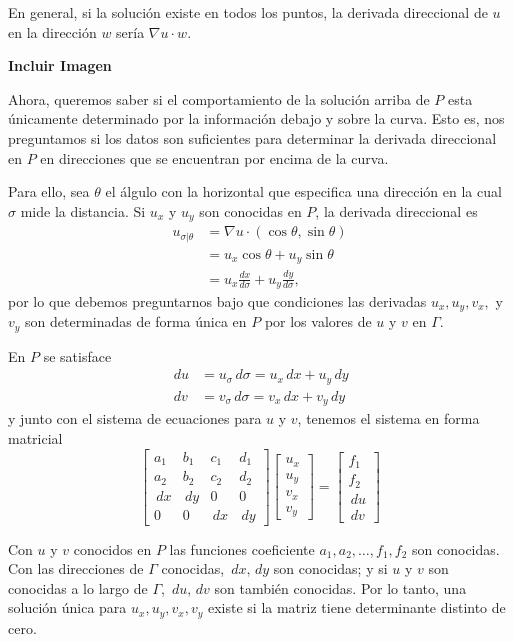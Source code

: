 En general, si la solución existe en todos los puntos, la derivada direccional de $u$ en la dirección $w$ sería $\nabla u \cdot w$.

\textbf{Incluir Imagen}

Ahora, queremos saber si el comportamiento de la solución arriba de $P$ esta únicamente determinado por la información debajo y sobre la curva. Esto es, nos preguntamos si los datos son suficientes para determinar la derivada direccional en $P$ en direcciones que se encuentran por encima de la curva.

Para ello, sea $\theta$ el álgulo con la horizontal que especifica una dirección en la cual $\sigma$ mide la distancia. Si $u_x$ y $u_y$ son conocidas en $P$, la derivada direccional es
\begin{align*}
u_{\sigma|\theta} &= \nabla u \cdot (\cos \theta, \sin \theta) \\
&= u_x \cos \theta + u_y \sin \theta \\
&= u_x \frac{dx}{d \sigma} + u_y \frac{dy}{d \sigma},
\end{align*}
por lo que debemos preguntarnos bajo que condiciones las derivadas  $u_x, u_y, v_x,$ y $v_y$ son determinadas de forma única en $P$ por los valores de $u$ y $v$ en $\Gamma$. 

En $P$ se satisface
\begin{align*}
\,du &= u_{\sigma} \,d\sigma = u_x \,dx + u_y \,dy \\
\,dv &= v_{\sigma} \,d\sigma = v_x \,dx + v_y \,dy
\end{align*}
y junto con el sistema de ecuaciones para $u$ y $v$, tenemos el sistema en forma matricial
\[	\begin{bmatrix}
a_1  & b_1  & c_1  & d_1 \\
a_2  & b_2  & c_2  & d_2	\\
\,dx & \,dy & 	0  & 0	\\
0	 & 0	 	& \,dx & \,dy 
\end{bmatrix}
\begin{bmatrix}
u_x \\
u_y \\
v_x \\
v_y
\end{bmatrix}
=
\begin{bmatrix}
f_1 \\
f_2 \\
\,du \\
\,dv
\end{bmatrix}	\]

Con $u$ y $v$ conocidos en $P$ las funciones coeficiente $a_1, a_2, \dots, f_1, f_2$ son conocidas. Con las direcciones de $\Gamma$ conocidas, $\,dx, \,dy$ son conocidas; y si $u$ y $v$ son conocidas a lo largo de $\Gamma$, $\,du, \,dv$ son también conocidas. Por lo tanto, una solución única para $u_x, u_y, v_x, v_y$ existe si la matriz tiene determinante distinto de cero.

